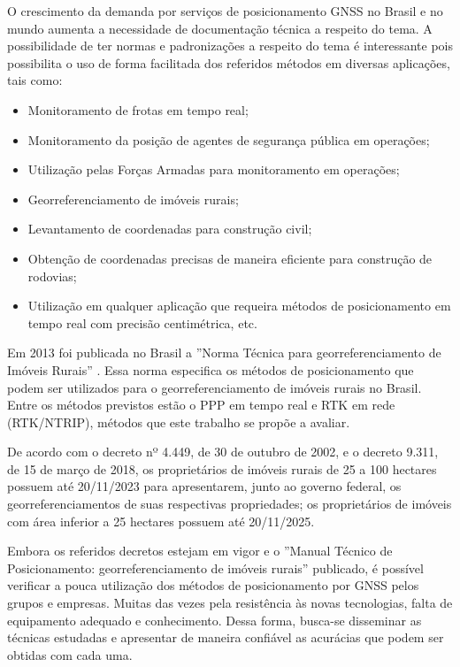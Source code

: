 O crescimento da demanda por serviços de posicionamento GNSS no Brasil e no mundo aumenta a necessidade de documentação técnica a respeito do tema. A possibilidade de ter normas e padronizações a respeito do tema é interessante pois possibilita o uso de forma facilitada dos referidos métodos em diversas aplicações, tais como:

\begin{itemize}
    \item Monitoramento de frotas em tempo real;
    \item Monitoramento da posição de agentes de segurança pública em operações;
    \item Utilização pelas Forças Armadas para monitoramento em operações;
    \item Georreferenciamento de imóveis rurais;
    \item Levantamento de coordenadas para construção civil;
    \item Obtenção de coordenadas precisas de maneira eficiente para construção de rodovias;
    \item Utilização em qualquer aplicação que requeira métodos de posicionamento em tempo real com precisão centimétrica, etc.
\end{itemize}



Em 2013 foi publicada no Brasil a ''Norma Técnica para georreferenciamento de Imóveis Rurais'' \citep{ibge_imoveis}. Essa norma especifica os métodos de posicionamento que podem ser utilizados para o georreferenciamento de imóveis rurais no Brasil. Entre os métodos previstos estão o PPP em tempo real e RTK em rede (RTK/NTRIP), métodos que este trabalho se propõe a avaliar.

De acordo com o decreto nº 4.449, de 30 de outubro de 2002, e o decreto 9.311, de 15 de março de 2018, os proprietários de imóveis rurais de 25 a 100 hectares possuem até 20/11/2023 para apresentarem, junto ao governo federal, os georreferenciamentos de suas respectivas propriedades; os proprietários de imóveis com área inferior a 25 hectares possuem até 20/11/2025.

Embora os referidos decretos estejam em vigor e o ''Manual Técnico de Posicionamento: georreferenciamento de imóveis rurais'' publicado, é possível verificar a pouca utilização dos métodos de posicionamento por GNSS pelos grupos e empresas. Muitas das vezes pela resistência às novas tecnologias, falta de equipamento adequado e conhecimento. Dessa forma, busca-se disseminar as técnicas estudadas e apresentar de maneira confiável as acurácias que podem ser obtidas com cada uma.

